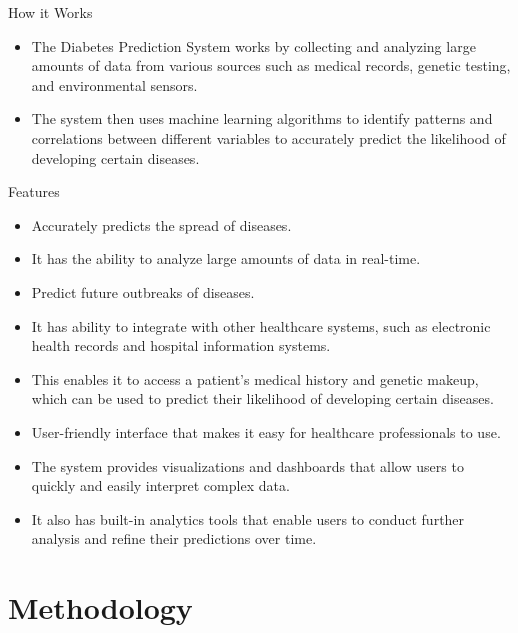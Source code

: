\documentclass{SKP-beamer}
\begin{document}
\begin{frame}{How it Works}
	\begin{itemize}
		\item The Diabetes Prediction System works by collecting and analyzing large amounts of data from various sources such as medical records, genetic testing, and environmental sensors.
		\item The system then uses machine learning algorithms to identify patterns and correlations between different variables to accurately predict the likelihood of developing certain diseases.
	\end{itemize}
\end{frame}

\begin{frame}{Features}
	\begin{itemize}
		\item Accurately predicts the spread of diseases. 
		\item It has the ability to analyze large amounts of data in real-time. 
		\item Predict future outbreaks of diseases. 
		\item It has ability to integrate with other healthcare systems, such as electronic health records and hospital information systems. 
		\item This enables it to access a patient's medical history and genetic makeup, which can be used to predict their likelihood of developing certain diseases.
		\item User-friendly interface that makes it easy for healthcare professionals to use. 
		\item The system provides visualizations and dashboards that allow users to quickly and easily interpret complex data. 
		\item It also has built-in analytics tools that enable users to conduct further analysis and refine their predictions over time.
		
	\end{itemize}
\end{frame}


\section{\textbf{Methodology}}
\end{document}
